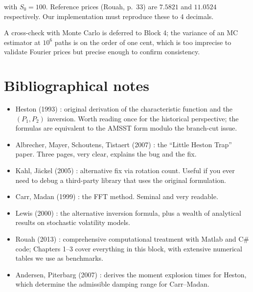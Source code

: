\documentclass[11pt]{article}
\theoremstyle{plain}
\theoremstyle{definition}
\theoremstyle{remark}
\begin{document}
with \(S_0 = 100\). Reference prices (Rouah, p.~33) are \(7.5821\) and \(11.0524\) respectively. Our implementation must reproduce these to 4 decimals.

A cross-check with Monte Carlo is deferred to Block 4; the variance of an MC estimator at \(10^6\) paths is on the order of one cent, which is too imprecise to validate Fourier prices but precise enough to confirm consistency.

\section{Bibliographical notes}

\begin{itemize}[topsep=2pt]
    \item Heston (1993) \cite{Heston1993}: original derivation of the characteristic function and the \((P_1, P_2)\) inversion. Worth reading once for the historical perspective; the formulas are equivalent to the AMSST form modulo the branch-cut issue.
    \item Albrecher, Mayer, Schoutens, Tistaert (2007) \cite{AMSS2007}: the ``Little Heston Trap'' paper. Three pages, very clear, explains the bug and the fix.
    \item Kahl, J\"ackel (2005) \cite{KahlJaeckel2005}: alternative fix via rotation count. Useful if you ever need to debug a third-party library that uses the original formulation.
    \item Carr, Madan (1999) \cite{CarrMadan1999}: the FFT method. Seminal and very readable.
    \item Lewis (2000) \cite{Lewis2000}: the alternative inversion formula, plus a wealth of analytical results on stochastic volatility models.
    \item Rouah (2013) \cite{Rouah2013}: comprehensive computational treatment with Matlab and C\# code; Chapters 1--3 cover everything in this block, with extensive numerical tables we use as benchmarks.
    \item Andersen, Piterbarg (2007) \cite{AndersenPiterbarg2007}: derives the moment explosion times for Heston, which determine the admissible damping range for Carr--Madan.
\end{itemize}
\end{document}
